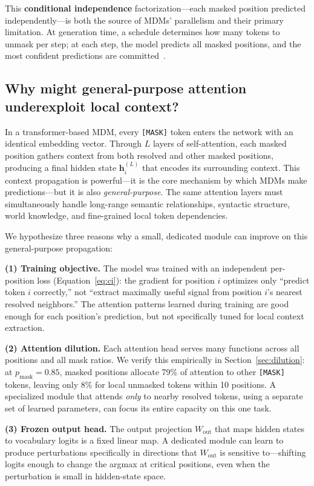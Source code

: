 \documentclass{article} %
\newcommand{\pmask}{p_{\text{mask}}}
\begin{document}
This \textbf{conditional independence} factorization---each masked position predicted independently---is both the source of MDMs' parallelism and their primary limitation.
At generation time, a schedule determines how many tokens to unmask per step; at each step, the model predicts all masked positions, and the most confident predictions are committed~\citep{nie2025llada}.

\subsection{Why might general-purpose attention underexploit local context?}

In a transformer-based MDM, every \texttt{[MASK]} token enters the network with an identical embedding vector.
Through $L$ layers of self-attention, each masked position gathers context from both resolved and other masked positions, producing a final hidden state $\mathbf{h}_i^{(L)}$ that encodes its surrounding context.
This context propagation is powerful---it is the core mechanism by which MDMs make predictions---but it is also \emph{general-purpose}.
The same attention layers must simultaneously handle long-range semantic relationships, syntactic structure, world knowledge, and fine-grained local token dependencies.

We hypothesize three reasons why a small, dedicated module can improve on this general-purpose propagation:

\textbf{(1) Training objective.}
The model was trained with an independent per-position loss (Equation~\ref{eq:ci}): the gradient for position $i$ optimizes only ``predict token $i$ correctly,'' not ``extract maximally useful signal from position $i$'s nearest resolved neighbors.''
The attention patterns learned during training are good enough for each position's prediction, but not specifically tuned for local context extraction.

\textbf{(2) Attention dilution.}
Each attention head serves many functions across all positions and all mask ratios.
We verify this empirically in Section~\ref{sec:dilution}: at $\pmask{=}0.85$, masked positions allocate 79\% of attention to other \texttt{[MASK]} tokens, leaving only 8\% for local unmasked tokens within 10 positions.
A specialized module that attends \emph{only} to nearby resolved tokens, using a separate set of learned parameters, can focus its entire capacity on this one task.

\textbf{(3) Frozen output head.}
The output projection $W_{\text{out}}$ that maps hidden states to vocabulary logits is a fixed linear map.
A dedicated module can learn to produce perturbations specifically in directions that $W_{\text{out}}$ is sensitive to---shifting logits enough to change the argmax at critical positions, even when the perturbation is small in hidden-state space.
\end{document}
